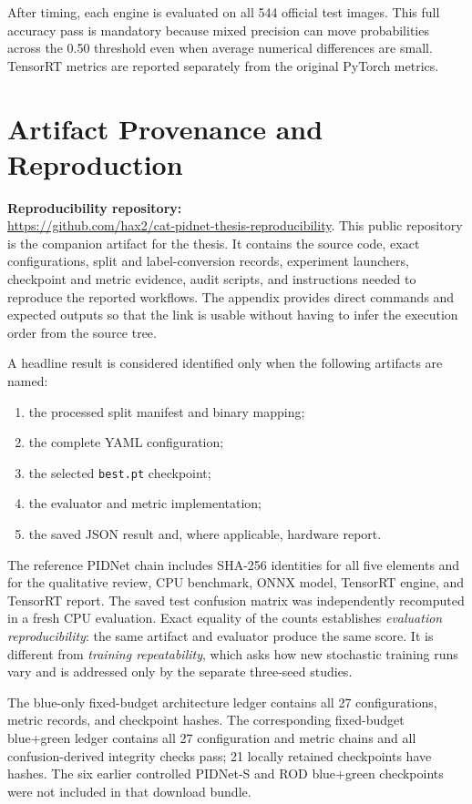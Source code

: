 After timing, each engine is evaluated on all 544 official test images. This
full accuracy pass is mandatory because mixed precision can move probabilities
across the 0.50 threshold even when average numerical differences are small.
TensorRT metrics are reported separately from the original PyTorch metrics.

\section{Artifact Provenance and Reproduction}

\noindent\textbf{Reproducibility repository:}\\
\url{https://github.com/hax2/cat-pidnet-thesis-reproducibility}. This public
repository is the companion artifact for the thesis. It contains the source
code, exact configurations, split and label-conversion records, experiment
launchers, checkpoint and metric evidence, audit scripts, and instructions
needed to reproduce the reported workflows. The appendix provides direct
commands and expected outputs so that the link is usable without having to
infer the execution order from the source tree.

A headline result is considered identified only when the following artifacts
are named:
\begin{enumerate}
  \item the processed split manifest and binary mapping;
  \item the complete YAML configuration;
  \item the selected \texttt{best.pt} checkpoint;
  \item the evaluator and metric implementation;
  \item the saved JSON result and, where applicable, hardware report.
\end{enumerate}

The reference PIDNet chain includes SHA-256 identities for all five elements and
for the qualitative review, CPU benchmark, ONNX model, TensorRT engine, and
TensorRT report. The saved test confusion matrix was independently recomputed
in a fresh CPU evaluation. Exact equality of the counts establishes
\emph{evaluation reproducibility}: the same artifact and evaluator produce the
same score. It is different from \emph{training repeatability}, which asks how
new stochastic training runs vary and is addressed only by the separate
three-seed studies.

The blue-only fixed-budget architecture ledger contains all 27 configurations,
metric records, and checkpoint hashes. The corresponding fixed-budget
blue+green ledger contains all 27 configuration and metric chains and all
confusion-derived integrity checks pass; 21 locally retained checkpoints have
hashes. The six earlier controlled PIDNet-S and ROD blue+green checkpoints
were not included in that download bundle.

